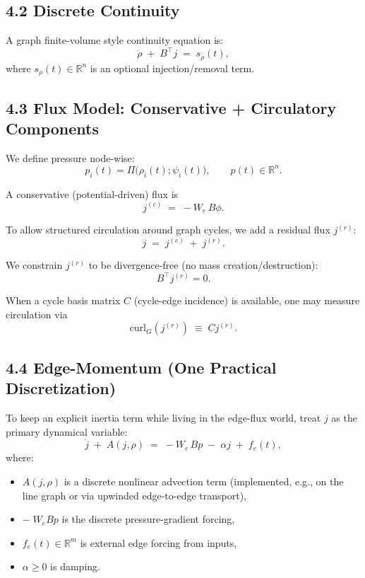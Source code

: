\documentclass[11pt]{article}
\begin{document}
\subsection*{4.2 Discrete Continuity}
A graph finite-volume style continuity equation is:
\begin{equation}\label{eq:graph_continuity}
\dot{\rho} \;+\; B^\top j \;=\; s_\rho(t),
\end{equation}
where $s_\rho(t)\in\mathbb{R}^n$ is an optional injection/removal term.

\subsection*{4.3 Flux Model: Conservative + Circulatory Components}
We define pressure node-wise:
\begin{equation}
p_i(t)=\Pi\big(\rho_i(t);\psi_i(t)\big),\qquad p(t)\in\mathbb{R}^n.
\end{equation}

A conservative (potential-driven) flux is
\begin{equation}
j^{(c)} \;=\; -W_e\,B\phi.
\end{equation}

To allow structured circulation around graph cycles, we add a residual flux $j^{(r)}$:
\begin{equation}
j \;=\; j^{(c)} \;+\; j^{(r)}.
\end{equation}

We constrain $j^{(r)}$ to be divergence-free (no mass creation/destruction):
\begin{equation}\label{eq:jr_divfree}
B^\top j^{(r)} = 0.
\end{equation}

When a cycle basis matrix $C$ (cycle-edge incidence) is available, one may measure circulation via
\begin{equation}
\mathrm{curl}_G(j^{(r)}) \;\equiv\; Cj^{(r)}.
\end{equation}

\subsection*{4.4 Edge-Momentum (One Practical Discretization)}
To keep an explicit inertia term while living in the edge-flux world, treat $j$ as the primary dynamical variable:
\begin{equation}\label{eq:edge_momentum}
\dot{j} \;+\; A(j,\rho) \;=\; -W_e\,B p \;-\;\alpha j \;+\; f_e(t),
\end{equation}
where:
\begin{itemize}
  \item $A(j,\rho)$ is a discrete nonlinear advection term (implemented, e.g., on the line graph or via upwinded edge-to-edge transport),
  \item $-\;W_eBp$ is the discrete pressure-gradient forcing,
  \item $f_e(t)\in\mathbb{R}^m$ is external edge forcing from inputs,
  \item $\alpha\ge 0$ is damping.
\end{itemize}
\end{document}
